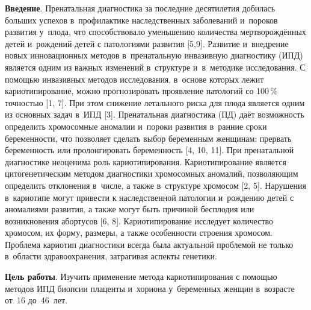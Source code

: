 \vspace{-16pt}



\makeProcTitleIIRazdel
{}

\textbf{Введение}. Пренатальная диагностика за последние десятилетия добилась больших успехов в~профилактике наследственных заболеваний и~пороков развития у~плода, что способствовало уменьшению количества мертворождённых детей и~рождений детей с патологиями развития [5,9]. Развитие и~внедрение новых инновационных методов в~пренатальную инвазивную диагностику (ИПД) является одним из важных изменений в~структуре и~в~методике исследования. С помощью инвазивных методов исследования, в~основе которых лежит кариотипирование, можно прогнозировать проявление патологий со 100\,\% точностью [1, 7]. При этом снижение летального риска для плода является одним из основных задач в~ИПД [3]. Пренатальная диагностика (ПД) даёт возможность определить хромосомные аномалии и~пороки развития в~ранние сроки беременности, что позволяет сделать выбор беременным женщинам: прервать беременность или пролонгировать беременность [4, 10, 11]. При пренатальной диагностике неоценима роль кариотипирования. Кариотипирование является цитогенетическим методом диагностики хромосомных аномалий, позволяющим определить отклонения в~числе, а также в~структуре хромосом [2, 5]. Нарушения в~кариотипе могут привести к наследственной патологии и~рождению детей с аномалиями развития, а также могут быть причиной бесплодия или возникновения абортусов [6, 8]. Кариотипирование исследует количество хромосом, их форму, размеры, а также особенности строения хромосом. Проблема кариотип диагностики всегда была актуальной проблемой не только в~области здравоохранения, затрагивая аспекты генетики.

\textbf{Цель работы}. Изучить применение метода кариотипирования с помощью методов ИПД биопсии плаценты и~хориона у~беременных женщин в~возрасте от~16 до~46~лет.

